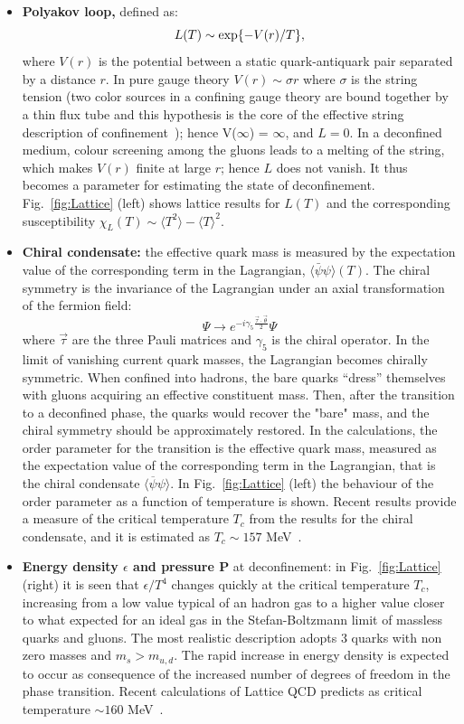 \begin{itemize}
\item \textbf{Polyakov loop,} defined as:
\begin{equation}
L(T)\sim {\rm exp}\{-V(r)/T\},
\end{equation}
where $V(r)$ is the potential between a static quark-antiquark pair separated by a distance $r$. 
In pure gauge theory $V(r)\sim \sigma r$ where $\sigma$ is the string tension (two color sources 
in a confining gauge theory are bound together by a thin flux tube and this hypothesis is the
core of the effective string description of confinement~\cite{Caselle:2002vq}); hence V($\infty$) = $\infty$, 
and $L = 0$. In a deconfined medium, colour screening among the gluons leads to a melting of the 
string, which makes $V(r)$ finite at large $r$; hence $L$ does not vanish. It thus 
becomes a parameter for estimating the state of deconfinement. 
Fig.~\ref{fig:Lattice} (left) shows lattice results for $L(T)$ and the 
corresponding susceptibility $\chi_L(T)\sim \langle T^2 \rangle - \langle T \rangle ^2$. 
\item \textbf{Chiral condensate: }the effective quark mass is measured by the expectation value 
of the corresponding term in the Lagrangian, $\langle  \bar{\psi}\psi\rangle (T)$. 
The chiral symmetry is the invariance of the Lagrangian under an axial transformation of the fermion field:
\begin{equation}
\Psi \rightarrow e^{-i \gamma_{5} \frac{\vec{\tau} \cdot \vec{\theta}}{2}}\Psi
\end{equation}
where $\vec{\tau}$ are the three Pauli matrices and $\gamma_5$ 
is the chiral operator. In the limit of 
vanishing current quark masses, the Lagrangian becomes 
chirally symmetric. When confined into 
hadrons, the bare quarks ``dress'' themselves with gluons acquiring 
an effective constituent mass. 
Then, after the transition to a deconfined phase, the quarks 
would recover the "bare" mass, and the 
chiral symmetry should be approximately restored. In the calculations, 
the order parameter for the transition is the effective 
quark mass, measured as the expectation value of the corresponding 
term in the Lagrangian, that is the 
chiral condensate $\langle \overline{\psi}\psi \rangle$. In Fig.~\ref{fig:Lattice} 
(left) the behaviour of 
the order parameter as a function of temperature is shown. 
Recent results provide a measure of the critical temperature $T_c$ from the results for the chiral condensate, 
and it is estimated as $T_c \sim 157 $ MeV~\cite{Borsanyi:2011bn}.
\item \textbf{Energy density $\epsilon$ and pressure P} at deconfinement: in Fig.~\ref{fig:Lattice} (right) it 
is seen that $\epsilon/T^4$ changes quickly at the critical temperature $T_c$, increasing from a low 
value typical of an hadron gas to a higher value closer to what expected for an ideal gas in the Stefan-Boltzmann limit of 
massless quarks and gluons. The most realistic description adopts 3 quarks with non zero masses and $m_s > m_{u,d}$. 
The rapid increase in energy density is expected to occur as consequence of the increased number of degrees of 
freedom in the phase transition. Recent calculations of Lattice QCD predicts as critical temperature $ \sim 160$ MeV~\cite{Karsch:2001vs}.


\end{itemize}
